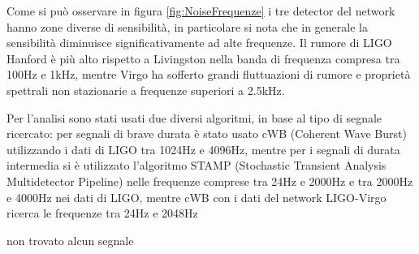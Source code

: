 Come si può osservare in figura \ref{fig:NoiseFrequenze} i tre detector del network hanno zone diverse di sensibilità, in particolare si nota che in generale la sensibilità diminuisce significativamente ad alte frequenze. Il rumore di LIGO Hanford è più alto rispetto a Livingston nella banda di frequenza compresa tra 100Hz e 1kHz, mentre Virgo ha sofferto grandi fluttuazioni di rumore e proprietà spettrali non stazionarie a frequenze superiori a 2.5kHz.

Per l'analisi sono stati usati due diversi algoritmi, in base al tipo di segnale ricercato: per segnali di brave durata è stato usato cWB (Coherent Wave Burst) utilizzando i dati di LIGO tra 1024Hz e 4096Hz, mentre per i segnali di durata intermedia si è utilizzato l'algoritmo STAMP (Stochastic Transient Analysis Multidetector Pipeline) nelle frequenze comprese tra 24Hz e 2000Hz e tra 2000Hz e 4000Hz nei dati di LIGO, mentre cWB con i dati del network LIGO-Virgo ricerca le frequenze tra 24Hz e 2048Hz



non trovato alcun segnale\cite{Abbott_2017a}